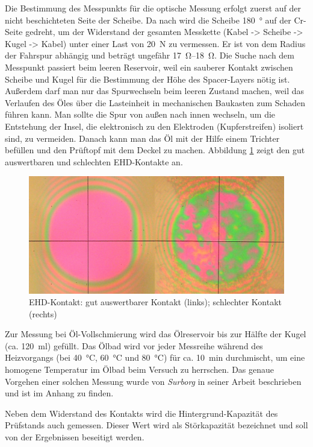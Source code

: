 Die Bestimmung des Messpunkts für die optische Messung erfolgt zuerst auf der nicht beschichteten Seite der Scheibe.
Da nach wird die Scheibe \SI{180}{\degree} auf der Cr-Seite gedreht, um der Widerstand der gesamten Messkette (Kabel -> Scheibe -> Kugel -> Kabel) unter einer Last von \SI{20}{\newton} zu vermessen.
Er ist von dem Radius der Fahrspur abhängig und beträgt ungefähr \SIrange{17}{18}{\ohm}.
Die Suche nach dem Messpunkt passiert beim leeren Reservoir, weil ein sauberer Kontakt zwischen Scheibe und Kugel für die Bestimmung der Höhe des Spacer-Layers nötig ist.
Außerdem darf man nur das Spurwechseln beim leeren Zustand machen, weil das Verlaufen des Öles über die Lasteinheit in mechanischen Baukasten zum Schaden führen kann.
Man sollte die Spur von außen nach innen wechseln, um die Entstehung der Insel, die elektronisch zu den Elektroden (Kupferstreifen) isoliert sind, zu vermeiden.
Danach kann man das Öl mit der Hilfe einem Trichter befüllen und den Prüftopf mit dem Deckel zu machen.
Abbildung \ref{fig:ehd_kontakt} zeigt den gut auswertbaren und schlechten EHD-Kontakte an.
\begin{figure}[htb]
    \centering
    \includegraphics[width=0.7\linewidth]{./images/ehd_kontakt.jpg}
    \caption{EHD-Kontakt: gut auswertbarer Kontakt (links); schlechter Kontakt (rechts) \cite{mach_2008}}
    \label{fig:ehd_kontakt}
\end{figure}

Zur Messung bei Öl-Vollschmierung wird das Ölreservoir bis zur Hälfte der Kugel (ca. \SI{120}{\ml}) gefüllt.
Das Ölbad wird vor jeder Messreihe während des Heizvorgangs (bei \SI{40}{\degreeCelsius}, \SI{60}{\degreeCelsius} und \SI{80}{\degreeCelsius}) für ca. \SI{10}{\minute} durchmischt, um eine homogene Temperatur im Ölbad beim Versuch zu herrschen.
Das genaue Vorgehen einer solchen Messung wurde von \textit{Surborg} in seiner Arbeit \cite{surborg_2007} beschrieben und ist im Anhang zu finden.

Neben dem Widerstand des Kontakts wird die Hintergrund-Kapazität des Prüfstands auch gemessen.
Dieser Wert wird als Störkapazität bezeichnet und soll von der Ergebnissen beseitigt werden.

